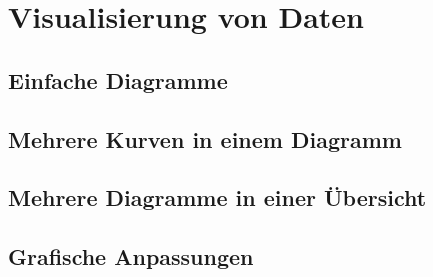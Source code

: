  \section{Visualisierung von Daten}
        \subsection{Einfache Diagramme}
        \subsection{Mehrere Kurven in einem Diagramm}
        \subsection{Mehrere Diagramme in einer Übersicht}
        \subsection{Grafische Anpassungen}